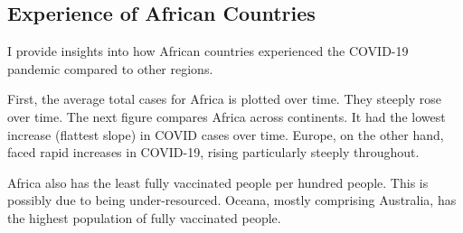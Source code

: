 \documentclass[11pt,preprint, authoryear]{elsarticle}
\numberwithin{equation}{section}
\numberwithin{figure}{section}
\numberwithin{table}{section}
\begin{document}
\hypertarget{experience-of-african-countries}{%
\subsection{Experience of African
Countries}\label{experience-of-african-countries}}

I provide insights into how African countries experienced the COVID-19
pandemic compared to other regions.

First, the average total cases for Africa is plotted over time. They
steeply rose over time. The next figure compares Africa across
continents. It had the lowest increase (flattest slope) in COVID cases
over time. Europe, on the other hand, faced rapid increases in COVID-19,
rising particularly steeply throughout.

Africa also has the least fully vaccinated people per hundred people.
This is possibly due to being under-resourced. Oceana, mostly comprising
Australia, has the highest population of fully vaccinated people.
\end{document}
